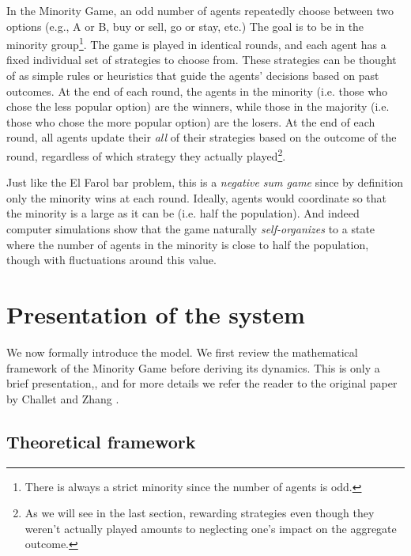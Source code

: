 \documentclass[a4paper, amsfonts, amssymb, amsmath, reprint, showkeys, nofootinbib, twoside]{revtex4-1}
\begin{document}
In the Minority Game, an odd number of agents repeatedly choose between two options (e.g., A or B, buy or sell, go or stay, etc.) The goal is to be in the minority group\footnote{There is always a strict minority since the number of agents is odd.}. The game is played in identical rounds, and each agent has a fixed individual set of strategies to choose from. These strategies can be thought of as simple rules or heuristics that guide the agents' decisions based on past outcomes. At the end of each round, the agents in the minority (i.e. those who chose the less popular option) are the winners, while those in the majority (i.e. those who chose the more popular option) are the losers. At the end of each round, all agents update their \textit{all} of their strategies based on the outcome of the round, regardless of which strategy they actually played\footnote{As we will see in the last section, rewarding strategies even though they weren't actually played amounts to neglecting one's impact on the aggregate outcome.}.

Just like the El Farol bar problem, this is a \textit{negative sum game} since by definition only the minority wins at each round. Ideally, agents would coordinate so that the minority is a large as it can be (i.e. half the population). And indeed computer simulations show that the game naturally \textit{self-organizes} to a state where the number of agents in the minority is close to half the population, though with fluctuations around this value.


\section{Presentation of the system}
\label{sec:presentation}

We now formally introduce the model. We first review the mathematical framework of the Minority Game before deriving its dynamics. This is only a brief presentation,, and for more details we refer the reader to the original paper by Challet and Zhang \cite{Challet_1997}.

\subsection{Theoretical framework}
\end{document}
